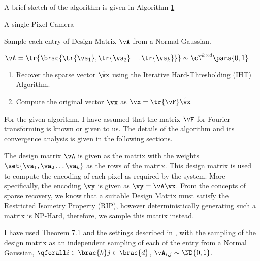 \documentclass{article}
\begin{document}
\begin{question}

	A brief sketch of the algorithm is given in Algorithm \hyperlink{algo:1}{1}

	\begin{algo}[0.9\textwidth]{A single Pixel Camera}

		\begin{enumerate}[label=\bt{\arabic*.}]

				Sample each entry of Design Matrix $\vA$ from a Normal Gaussian.

				\hspace{2em} $\vA = \tr{\brac{\tr{\va_1}, \tr{\va_2} \dots \tr{\va_k}}} \sim \cN^{k \times d}\para{0, 1}$


			\begin{enumerate}
				\item Recover the sparse vector $\hat{\vx}$ using the Iterative Hard-Thresholding (IHT) Algorithm.
				\item Compute the original vector $\vx$ as $\vx = \tr{\vF} \hat{\vx}$
			\end{enumerate}
		\end{enumerate}

	\end{algo}

	For the given algorithm, I have assumed that the matrix $\vF$ for Fourier transforming is known or given to us. The details of the algorithm and its convergence analysis is given in the following sections.

	\begin{enumerate}[label=\bt{\arabic*.}]

			The design matrix $\vA$ is given as the matrix with the weights $\set{\va_1, \va_2 \dots \va_k}$ as the rows of the matrix. This design matrix is used to compute the encoding of each pixel as required by the system. More specifically, the encoding $\vy$ is given as $\vy = \vA \vx$. From the concepts of sparse recovery, we know that a suitable Design Matrix must satisfy the Restricted Isometry Property (RIP), however deterministically generating such a matrix is NP-Hard, therefore, we sample this matrix instead.

			I have used Theorem 7.1 and the settings described in \cite{puru}, with the sampling of the design matrix as an independent sampling of each of the entry from a Normal Gaussian, \ie $\qforall i \in \brac{k} j \in \brac{d}$, $\vA_{i, j} \sim \ND{0, 1}$.


\end{enumerate}
\end{question}
\end{document}
